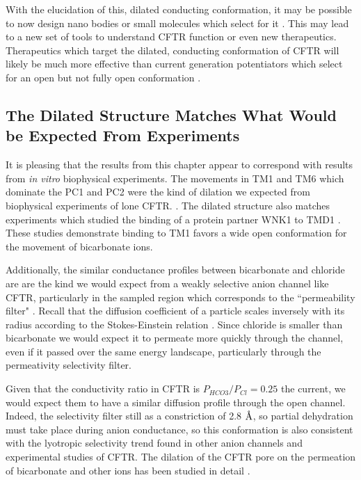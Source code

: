 With the elucidation of this, dilated conducting conformation, it may be possible to now design nano bodies or small molecules which select for it \cite{hutter2019}. This may lead to a new set of tools to understand CFTR function or even new therapeutics. Therapeutics which target the dilated, conducting conformation of CFTR will likely be much more effective than current generation potentiators which select for an open but not fully open conformation \cite{csanady2019}. 

\subsection{The Dilated Structure Matches What Would be Expected From Experiments}
It is pleasing that the results from this chapter appear to correspond with results from \textit{in vitro} biophysical experiments. The movements in TM1 and TM6 which dominate the PC1 and PC2 were the kind of dilation we expected from biophysical experiments of lone CFTR. \cite{negoda2019,linsdell2016}. The dilated structure also matches experiments which studied the binding of a protein partner WNK1 to TMD1 \cite{kim2019}. These studies demonstrate binding to TM1 favors a wide open conformation for the movement of bicarbonate ions.  

Additionally, the similar conductance profiles between bicarbonate and chloride are are the kind we would expect from a weakly selective anion channel like CFTR, particularly in the sampled region which corresponds to the ``permeability filter" \cite{linsdell2016}. Recall that the diffusion coefficient of a particle scales inversely with its radius according to the Stokes-Einstein relation \cite{miller1924}. Since chloride is smaller than bicarbonate we would expect it to permeate more quickly through the channel, even if it passed over the same energy landscape, particularly through the permeativity selectivity filter. 

Given that the conductivity ratio in CFTR is $P_{HCO3}/P_{Cl}=0.25$ the current, we would expect them to have a similar diffusion profile through the open channel. Indeed, the selectivity filter still as a constriction of 2.8 $\textup{\AA}$, so partial dehydration must take place during anion conductance, so this conformation is also consistent with the lyotropic selectivity trend found in other anion channels and experimental studies of CFTR. The dilation of the CFTR pore on the permeation of bicarbonate and other ions has been studied in detail \cite{jun2016, kim2019}.

